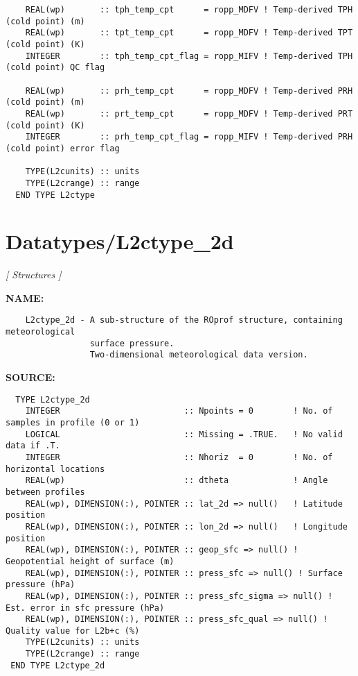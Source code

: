\begin{Verbatim}
    REAL(wp)       :: tph_temp_cpt      = ropp_MDFV ! Temp-derived TPH (cold point) (m)
    REAL(wp)       :: tpt_temp_cpt      = ropp_MDFV ! Temp-derived TPT (cold point) (K)
    INTEGER        :: tph_temp_cpt_flag = ropp_MIFV ! Temp-derived TPH (cold point) QC flag

    REAL(wp)       :: prh_temp_cpt      = ropp_MDFV ! Temp-derived PRH (cold point) (m)
    REAL(wp)       :: prt_temp_cpt      = ropp_MDFV ! Temp-derived PRT (cold point) (K)
    INTEGER        :: prh_temp_cpt_flag = ropp_MIFV ! Temp-derived PRH (cold point) error flag

    TYPE(L2cunits) :: units
    TYPE(L2crange) :: range
  END TYPE L2ctype
\end{Verbatim}
\section{Datatypes/L2ctype\_2d}
\textsl{[ Structures ]}

\label{ch:robo46}
\label{ch:Datatypes_L2ctype_2d}
\textbf{NAME:}\hspace{0.08in}\begin{Verbatim}
    L2ctype_2d - A sub-structure of the ROprof structure, containing meteorological
                 surface pressure.
                 Two-dimensional meteorological data version.
\end{Verbatim}
\textbf{SOURCE:}\hspace{0.08in}\begin{Verbatim}
  TYPE L2ctype_2d
    INTEGER                         :: Npoints = 0        ! No. of samples in profile (0 or 1)
    LOGICAL                         :: Missing = .TRUE.   ! No valid data if .T.
    INTEGER                         :: Nhoriz  = 0        ! No. of horizontal locations
    REAL(wp)                        :: dtheta             ! Angle between profiles
    REAL(wp), DIMENSION(:), POINTER :: lat_2d => null()   ! Latitude position
    REAL(wp), DIMENSION(:), POINTER :: lon_2d => null()   ! Longitude position
    REAL(wp), DIMENSION(:), POINTER :: geop_sfc => null() ! Geopotential height of surface (m)
    REAL(wp), DIMENSION(:), POINTER :: press_sfc => null() ! Surface pressure (hPa)
    REAL(wp), DIMENSION(:), POINTER :: press_sfc_sigma => null() ! Est. error in sfc pressure (hPa)
    REAL(wp), DIMENSION(:), POINTER :: press_sfc_qual => null() ! Quality value for L2b+c (%)
    TYPE(L2cunits) :: units
    TYPE(L2crange) :: range
 END TYPE L2ctype_2d
\end{Verbatim}
